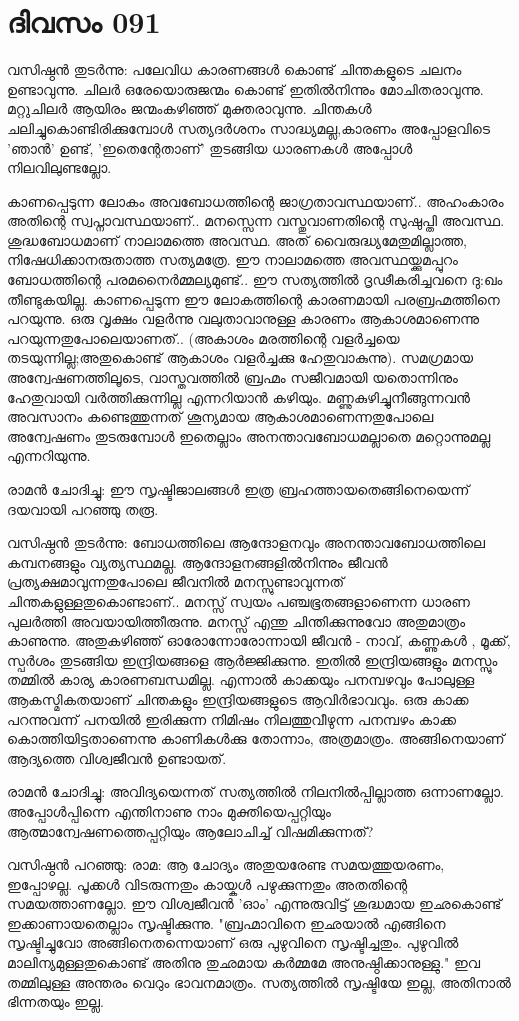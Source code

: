  
\section{ദിവസം 091}


വസിഷ്ഠന്‍ തുടര്‍ന്നു: പലേവിധ കാരണങ്ങള്‍ കൊണ്ട്‌ ചിന്തകളുടെ ചലനം ഉണ്ടാവുന്നു. ചിലര്‍ ഒരേയൊരുജന്മം കൊണ്ട്‌ ഇതില്‍നിന്നും മോചിതരാവുന്നു. മറ്റുചിലര്‍ ആയിരം ജന്മംകഴിഞ്ഞ്‌ മുക്തരാവുന്നു. ചിന്തകള്‍ ചലിച്ചുകൊണ്ടിരിക്കുമ്പോള്‍ സത്യദര്‍ശനം സാദ്ധ്യമല്ല,കാരണം അപ്പോളവിടെ 'ഞാന്‍' ഉണ്ട്‌, 'ഇതെന്റേതാണ്‌' തുടങ്ങിയ ധാരണകള്‍ അപ്പോള്‍  നിലവിലുണ്ടല്ലോ. 

കാണപ്പെടുന്ന ലോകം അവബോധത്തിന്റെ ജാഗ്രതാവസ്ഥയാണ്‌.. അഹംകാരം അതിന്റെ സ്വപ്നാവസ്ഥയാണ്‌.. മനസ്സെന്ന വസ്തുവാണതിന്റെ സുഷുപ്തി അവസ്ഥ. ശുദ്ധബോധമാണ്‌ നാലാമത്തെ അവസ്ഥ. അത്‌ വൈരുദ്ധ്യമേതുമില്ലാത്ത, നിഷേധിക്കാനരുതാത്ത സത്യമത്രേ. ഈ നാലാമത്തെ അവസ്ഥയ്ക്കുമപ്പുറം ബോധത്തിന്റെ പരമനൈര്‍മ്മല്യമുണ്ട്‌.. ഈ സത്യത്തില്‍ ദൃഢീകരിച്ചവനെ ദു:ഖം തീണ്ടുകയില്ല. കാണപ്പെടുന്ന ഈ ലോകത്തിന്റെ കാരണമായി പരബ്രഹ്മത്തിനെ പറയുന്നു. ഒരു വൃക്ഷം വളര്‍ന്നു വലുതാവാനുള്ള കാരണം ആകാശമാണെന്നു പറയുന്നതുപോലെയാണത്‌.. (അകാശം മരത്തിന്റെ വളര്‍ച്ചയെ തടയുന്നില്ല;അതുകൊണ്ട്‌ ആകാശം വളര്‍ച്ചക്കു ഹേതുവാകുന്നു). സമഗ്രമായ അന്വേഷണത്തിലൂടെ, വാസ്തവത്തില്‍ ബ്രഹ്മം സജീവമായി യതൊന്നിനും ഹേതുവായി വര്‍ത്തിക്കുന്നില്ല എന്നറിയാന്‍ കഴിയും. മണ്ണുകുഴിച്ചുനീങ്ങുന്നവന്‍ അവസാനം കണ്ടെത്തുന്നത്‌ ശൂന്യമായ ആകാശമാണെന്നതുപോലെ അന്വേഷണം തുടരുമ്പോള്‍ ഇതെല്ലാം അനന്താവബോധമല്ലാതെ മറ്റൊന്നുമല്ല എന്നറിയുന്നു. 

രാമന്‍ ചോദിച്ചു: ഈ സൃഷ്ടിജാലങ്ങള്‍ ഇത്ര ബ്രഹത്തായതെങ്ങിനെയെന്ന് ദയവായി പറഞ്ഞു തരൂ. 

വസിഷ്ഠന്‍ തുടര്‍ന്നു: ബോധത്തിലെ ആന്ദോളനവും അനന്താവബോധത്തിലെ കമ്പനങ്ങളും വ്യത്യസ്ഥമല്ല. ആന്ദോളനങ്ങളില്‍നിന്നും ജീവന്‍ പ്രത്യക്ഷമാവുന്നതുപോലെ ജീവനില്‍ മനസ്സുണ്ടാവുന്നത്‌ ചിന്തകളുള്ളതുകൊണ്ടാണ്‌.. മനസ്സ്‌ സ്വയം പഞ്ചഭൂതങ്ങളാണെന്ന  ധാരണ പുലര്‍ത്തി അവയായിത്തീരുന്നു. മനസ്സ്‌ എന്തു ചിന്തിക്കുന്നുവോ അതുമാത്രം കാണുന്നു. അതുകഴിഞ്ഞ്‌ ഓരോന്നോരോന്നായി ജീവന്‍ - നാവ്‌, കണ്ണുകള്‍ , മൂക്ക്‌, സ്പര്‍ശം തുടങ്ങിയ ഇന്ദ്രിയങ്ങളെ ആര്‍ജ്ജിക്കുന്നു. ഇതില്‍ ഇന്ദ്രിയങ്ങളും മനസ്സും തമ്മില്‍ കാര്യ കാരണബന്ധമില്ല. എന്നാല്‍ കാക്കയും പനമ്പഴവും പോലുള്ള ആകസ്മികതയാണ്‌ ചിന്തകളും ഇന്ദ്രിയങ്ങളുടെ ആവിര്‍ഭാവവും. ഒരു കാക്ക പറന്നുവന്ന് പനയില്‍ ഇരിക്കുന്ന നിമിഷം നിലത്തുവീഴുന്ന പനമ്പഴം കാക്ക കൊത്തിയിട്ടതാണെന്നു കാണികള്‍ക്കു തോന്നാം, അത്രമാത്രം. അങ്ങിനെയാണ്‌ ആദ്യത്തെ വിശ്വജീവന്‍ ഉണ്ടായത്‌.

രാമന്‍ ചോദിച്ചു: അവിദ്യയെന്നത്‌ സത്യത്തില്‍ നിലനില്‍പ്പില്ലാത്ത ഒന്നാണല്ലോ. അപ്പോള്‍പ്പിന്നെ എന്തിനാണു നാം മുക്തിയെപ്പറ്റിയും ആത്മാന്വേഷണത്തെപ്പറ്റിയും ആലോചിച്ച്  വിഷമിക്കുന്നത്‌? 

വസിഷ്ഠന്‍ പറഞ്ഞു: രാമ: ആ ചോദ്യം അതുയരേണ്ട സമയത്തുയരണം, ഇപ്പോഴല്ല. പൂക്കള്‍ വിടരുന്നതും കായ്കള്‍ പഴുക്കുന്നതും അതതിന്റെ സമയത്താണല്ലോ. ഈ വിശ്വജീവന്‍ 'ഓം' എന്നുരുവിട്ട്‌ ശുദ്ധമായ ഇഛകൊണ്ട്‌ ഇക്കാണായതെല്ലാം സൃഷ്ടിക്കുന്നു. "ബ്രഹ്മാവിനെ ഇഛയാല്‍ എങ്ങിനെ സൃഷ്ടിച്ചുവോ അങ്ങിനെതന്നെയാണ്‌ ഒരു പുഴുവിനെ സൃഷ്ടിച്ചതും. പുഴുവില്‍ മാലിന്യമുള്ളതുകൊണ്ട്‌ അതിനു തുഛമായ കര്‍മ്മമേ അനുഷ്ഠിക്കാനുള്ളു." ഇവ തമ്മിലുള്ള അന്തരം വെറും ഭാവനമാത്രം. സത്യത്തില്‍ സൃഷ്ടിയേ ഇല്ല, അതിനാല്‍ ഭിന്നതയും ഇല്ല. 
